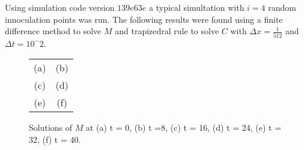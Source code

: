 Using simulation code version $139e63e$ a typical simultation with $i = 4$ random innoculation points was run. The following results were found using a finite difference method to solve $M$ and trapizedral rule to solve $C$ with $\Delta x = \frac{1}{512}$ and $\Delta t = 10^-2$.

\begin{figure}[h!tb]
\begin{center}
  \begin{tabular}{c c}
      (a) & (b) \\
      (c) & (d) \\
      (e) & (f)
   \end{tabular}
  \caption{Solutions of $M$ at (a) t = 0, (b) t =8, (c) t = 16, (d) t = 24, (e) t = 32, (f) t = 40. } 
  \label{fig:solution42}
\end{center}
\end{figure}



